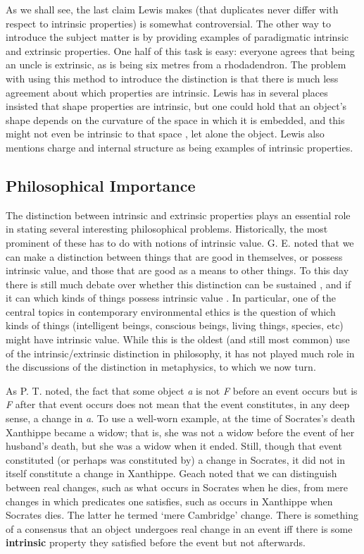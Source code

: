 \noindent As we shall see, the last claim Lewis makes (that duplicates never differ with respect to intrinsic properties) is somewhat controversial. The other way to introduce the subject matter is by providing examples of paradigmatic intrinsic and extrinsic properties. One half of this task is easy: everyone agrees that being an uncle is extrinsic, as is being six metres from a rhodadendron. The problem with using this method to introduce the distinction is that there is much less agreement about which properties are intrinsic. Lewis has in several places \citeyearpar{Lewis1983b, Lewis1986a, Lewis1988c} insisted that shape properties are intrinsic, but one could hold that an object's shape depends on the curvature of the space in which it is embedded, and this might not even be intrinsic to that space \citep{Nerlich1979}, let alone the object. Lewis also mentions charge and internal structure as being examples of intrinsic properties.

\subsection{Philosophical Importance}
The distinction between intrinsic and extrinsic properties plays an essential role in stating several interesting philosophical problems. Historically, the most prominent of these has to do with notions of intrinsic value. G. E. \cite[]{Moore1903} noted that we can make a distinction between things that are good in themselves, or possess intrinsic value, and those that are good as a means to other things. To this day there is still much debate over whether this distinction can be sustained \citep{Feldman1998, Kagan1998}, and if it can which kinds of things possess intrinsic value \citet{Krebs1999}. In particular, one of the central topics in contemporary environmental ethics is the question of which kinds of things (intelligent beings, conscious beings, living things, species, etc) might have intrinsic value. While this is the oldest (and still most common) use of the intrinsic/extrinsic distinction in philosophy, it has not played much role in the discussions of the distinction in metaphysics, to which we now turn.

As P. T.\citet{Geach1969} noted, the fact that some object \textit{a} is not \textit{F} before an event occurs but is \textit{F} after that event occurs does not mean that the event constitutes, in any deep sense, a change in \textit{a}. To use a well-worn example, at the time of Socrates's death Xanthippe became a widow; that is, she was not a widow before the event of her husband's death, but she was a widow when it ended. Still, though that event constituted (or perhaps was constituted by) a change in Socrates, it did not in itself constitute a change in Xanthippe. Geach noted that we can distinguish between real changes, such as what occurs in Socrates when he dies, from mere changes in which predicates one satisfies, such as occurs in Xanthippe when Socrates dies. The latter he termed `mere Cambridge' change. There is something of a consensus that an object undergoes real change in an event iff there is some \textbf{intrinsic} property they satisfied before the event but not afterwards.

